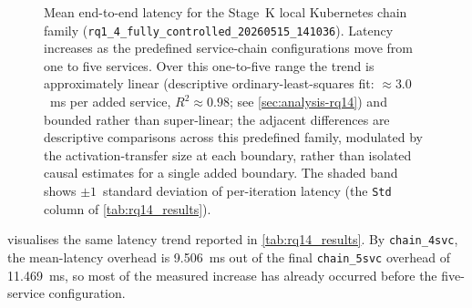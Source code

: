 \begin{figure}[htbp]
\centering
\resizebox{0.92\textwidth}{!}{%

}
\caption[Stage~K local Kubernetes chain mean latency]{Mean end-to-end latency for the Stage~K local Kubernetes chain family
(\texttt{rq1\_4\_fully\_controlled\_20260515\_141036}). Latency increases as
the predefined service-chain configurations move from one to five services. Over
this one-to-five range the trend is approximately linear (descriptive
ordinary-least-squares fit: $\approx 3.0$~ms per added service, $R^{2}\approx
0.98$; see \cref{sec:analysis-rq14}) and bounded rather than super-linear; the
adjacent differences are descriptive comparisons across this predefined family,
modulated by the activation-transfer size at each boundary, rather than isolated
causal estimates for a single added boundary. The shaded band shows $\pm 1$~standard
deviation of per-iteration latency (the \texttt{Std} column of
\cref{tab:rq14_results}).}
\label{fig:rq14_kubernetes_chain_latency}
\end{figure}

 visualises the same latency trend reported in
\cref{tab:rq14_results}. By \texttt{chain\_4svc}, the mean-latency overhead is
9.506~ms out of the final \texttt{chain\_5svc} overhead of 11.469~ms, so most
of the measured increase has already occurred before the five-service
configuration.

\begin{table}[ht]
\centering
\caption[Stage~K overhead and non-compute cost breakdown]{Stage~K overhead and non-compute/platform cost breakdown. Recorded tensor-byte totals are taken from \texttt{total\_activation\_bytes\_mean} in \texttt{merged\_results/condition\_summaries.csv} and converted to KiB (1024 bytes/KiB); the metric includes the input tensor. The platform column is \texttt{non\_compute\_overhead\_ms\_mean}.}
\label{tab:rq14_overhead}
\end{table}

